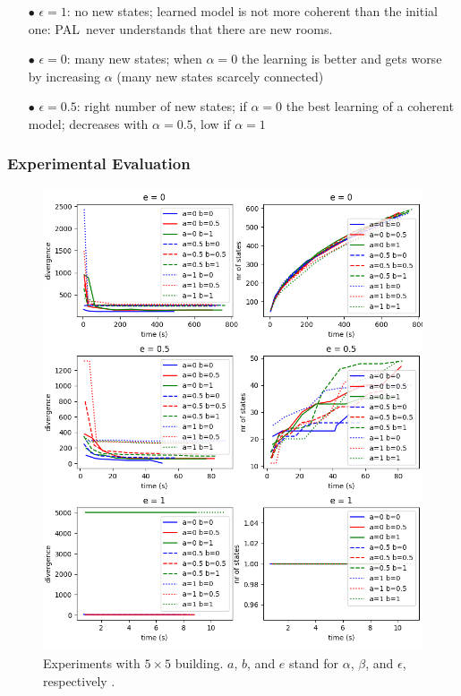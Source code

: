 \documentclass{beamer}
\def\PAL{\textsc{PAL}}
\begin{document}
\begin{frame}
\begin{itemize}
\item[$\bullet$] 
{\color {red} $\epsilon = 1$:} no new states; learned model is not more coherent than the initial one: \PAL\ never understands that there are new rooms.  
\item [$\bullet$]
{\color {red} $\epsilon = 0$:}  many new states; when $\alpha = 0$ the learning is better and  gets worse by increasing $\alpha$  (many new states
  scarcely connected)
\item [$\bullet$] 
{\color {red} $\epsilon = 0.5$:} right number of
  new states; if $\alpha = 0$ 
  the best learning of a coherent model; decreases with $\alpha=0.5$, low if $\alpha = 1$
\end{itemize}

\end{frame}

\begin{frame}
\frametitle{Experimental Evaluation}
\vspace*{-0.5cm}
\begin{figure}
\centering
\includegraphics[width=0.7\columnwidth]{big_exp.png}
\caption{Experiments with $5\times5$ building. $a$, $b$, and $e$ stand for $\alpha$, $\beta$, and $\epsilon$, respectively \label{fig:big_experiments}.}
\end{figure}

\end{frame}
\end{document}
